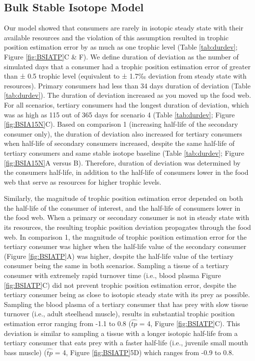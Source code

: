 \documentclass [11pt, proquest] {uwthesis}[2015/03/03]
\begin{document}
\subsection{Bulk Stable Isotope
Model}\label{bulk-stable-isotope-model-1}

Our model showed that consumers are rarely in isotopic steady state with
their available resources and the violation of this assumption resulted
in trophic position estimation error by as much as one trophic level
(Table \ref{tab:durdev}; Figure \ref{fig:BSIATP}C \& F). We define
duration of deviation as the number of simulated days that a consumer
had a trophic position estimation error of greater than ± 0.5 trophic
level (equivalent to ± 1.7‰ deviation from steady state with resources).
Primary consumers had less than 34 days duration of deviation (Table
\ref{tab:durdev}). The duration of deviation increased as you moved up
the food web. For all scenarios, tertiary consumers had the longest
duration of deviation, which was as high as 115 out of 365 days for
scenario 4 (Table \ref{tab:durdev}; Figure \ref{fig:BSIA15N}C). Based on
comparison 1 (increasing half-life of the secondary consumer only), the
duration of deviation also increased for tertiary consumers when
half-life of secondary consumers increased, despite the same half-life
of tertiary consumers and same stable isotope baseline (Table
\ref{tab:durdev}; Figure \ref{fig:BSIA15N}A versus B). Therefore,
duration of deviation was determined by the consumers half-life, in
addition to the half-life of consumers lower in the food web that serve
as resources for higher trophic levels.

Similarly, the magnitude of trophic position estimation error depended
on both the half-life of the consumer of interest, and the half-life of
consumers lower in the food web. When a primary or secondary consumer is
not in steady state with its resources, the resulting trophic position
deviation propagates through the food web. In comparison 1, the
magnitude of trophic position estimation error for the tertiary consumer
was higher when the half-life value of the secondary consumer (Figure
\ref{fig:BSIATP}A) was higher, despite the half-life value of the
tertiary consumer being the same in both scenarios. Sampling a tissue of
a tertiary consumer with extremely rapid turnover time (i.e., blood
plasma Figure \ref{fig:BSIATP}C) did not prevent trophic position
estimation error, despite the tertiary consumer being as close to
isotopic steady state with its prey as possible. Sampling the blood
plasma of a tertiary consumer that has prey with slow tissue turnover
(i.e., adult steelhead muscle), results in substantial trophic position
estimation error ranging from -1.1 to 0.8 (\(\widehat{tp}\) = 4, Figure
\ref{fig:BSIATP}C). This deviation is similar to sampling a tissue with
a longer isotopic half-life from a tertiary consumer that eats prey with
a faster half-life (i.e., juvenile small mouth bass muscle)
(\(\widehat{tp}\) = 4, Figure \ref{fig:BSIATP}5D) which ranges from -0.9
to 0.8.
\end{document}
